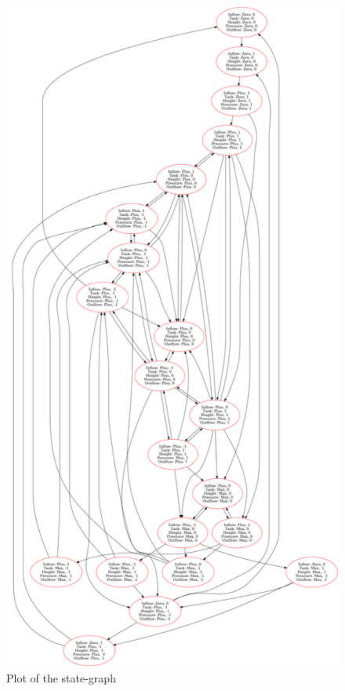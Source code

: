 \documentclass[a4paper]{article}
\begin{document}
\begin{figure}\label{state-graph}
\centering
\includegraphics[width=\textwidth,height=\textheight,keepaspectratio]{result.png}
\caption{Plot of the state-graph}
\end{figure}
\end{document}
